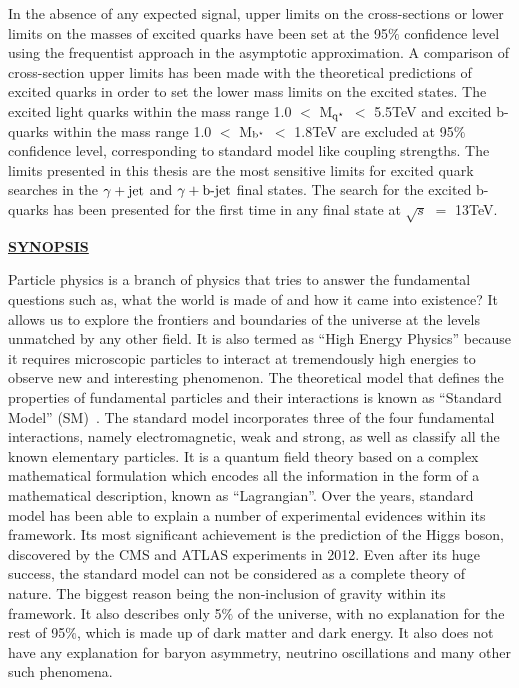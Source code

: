 \documentclass[12pt,a4]{article}
\begin{document}
In the absence of any expected signal, upper limits on the cross-sections or lower limits on the masses of excited quarks have been set at the 95$\%$ confidence level
using the frequentist approach in the asymptotic approximation. A comparison of cross-section upper limits has been made with the theoretical predictions of
excited quarks in order to set the lower mass limits on the excited states. The excited light quarks within the mass range
1.0 $<$ M$_{\mathrm{q^\star}}$ $<$ 5.5\unit{TeV} and excited b-quarks within the mass range 1.0 $<$ M$_{\mathrm{b^\star}}$ $<$ 1.8\unit{TeV} are excluded at 95$\%$ confidence level,
corresponding to standard model like coupling strengths. The limits presented in this thesis are the most
sensitive limits for excited quark searches in the $\gamma+\mathrm{jet}$ and $\gamma+\mathrm{b}\textrm{-}\mathrm{jet}$ final states. The search for the excited b-quarks has been presented for the first time
in any final state at $\sqrt{s}$ $=$ 13\unit{TeV}.

\begin{center}
  \clearpage
  \vspace{5mm}
  \noindent\uppercase{\Large \textbf{\underline{SYNOPSIS}}}
  \vspace{1cm}
\end{center}
\onehalfspacing
Particle physics is a branch of physics that tries to answer the fundamental questions such as, what the world is made of and how it came into existence?
It allows us to explore the
frontiers and boundaries of the universe at the levels unmatched by any other field. It is also termed as ``High Energy Physics'' because it requires microscopic
particles to interact at tremendously high energies to observe new and interesting phenomenon. The theoretical model that defines the properties of fundamental
particles and their interactions is known as ``Standard Model'' (SM)~\cite{Glashow:1961tr, Salam:1964ry, Weinberg:1967tq,Gross:1973id, Politzer:1973fx}.
The standard model incorporates three of the four fundamental interactions, namely electromagnetic, weak and strong, as well as classify all the known elementary
particles. It is a quantum field theory based on a complex mathematical formulation which encodes all the information in the form of a mathematical description,
known as ``Lagrangian''. Over the years, standard model has been able to explain a number of experimental evidences within its framework. Its most significant
achievement is the prediction of the Higgs boson, discovered by the CMS and ATLAS experiments in 2012.
Even after its huge success, the standard model can not be considered as a complete theory of nature. The biggest reason being the non-inclusion of gravity within its
framework. It also describes only 5$\%$ of the universe, with no explanation for the rest of 95$\%$, which is made up of dark matter and dark energy.
It also does not have any explanation for baryon asymmetry, neutrino oscillations and many other such phenomena. 
\end{document}
